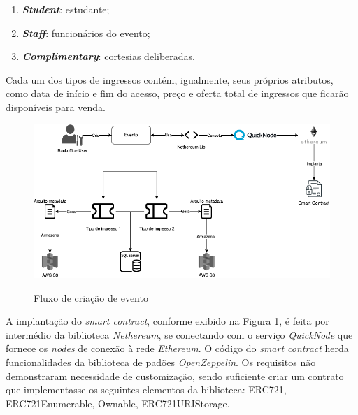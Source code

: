 {\begin{enumerate}
    \item \textit{\textbf{Student}}: estudante;
    
    \item \textit{\textbf{Staff}}: funcionários do evento;
    
    \item \textit{\textbf{Complimentary}}: cortesias deliberadas.
\end{enumerate}

Cada um dos tipos de ingressos contém, igualmente, seus próprios atributos, como data de início e fim do acesso, preço e oferta total de ingressos que ficarão disponíveis para venda.

\begin{figure}[ht]
    \centering
    \caption{Fluxo de criação de evento}
    \includegraphics[scale=0.37]{figuras/event-creation.png}
    \label{fig:event-creation}
\end{figure}


A implantação do \textit{smart contract}, conforme exibido na Figura \ref{fig:event-creation}, é feita por intermédio da biblioteca \textit{Nethereum}, se conectando com o serviço \textit{QuickNode} que fornece os \textit{nodes} de conexão à rede \textit{Ethereum}. O código do \textit{smart contract} herda funcionalidades da biblioteca de padões \textit{OpenZeppelin}. Os requisitos não demonstraram necessidade de customização, sendo suficiente criar um contrato que implementasse os seguintes elementos da biblioteca: ERC721, ERC721Enumerable, Ownable, ERC721URIStorage.


}
